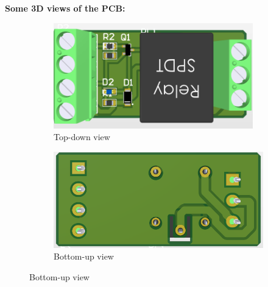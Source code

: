 \textbf{Some 3D views of the PCB:}
\begin{figure}[h!]
    \centering
    \begin{subfigure}{0.495\textwidth}
        \centering
        \includegraphics[width=0.95\textwidth]{graphics/ex2/f9.png}
        \caption*{Top-down view}
    \end{subfigure}
    \hfill
    \begin{subfigure}{0.495\textwidth}
        \centering
        \includegraphics[width=\textwidth]{graphics/ex2/f10.png}
        \caption*{Bottom-up view}
    \end{subfigure}
\end{figure}